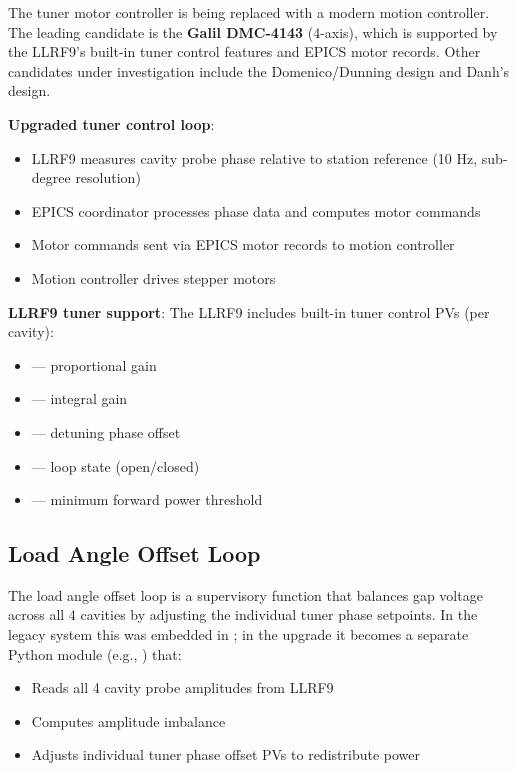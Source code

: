 The tuner motor controller is being replaced with a modern motion controller. The leading candidate is the \textbf{Galil DMC-4143} (4-axis), which is supported by the LLRF9's built-in tuner control features and EPICS motor records. Other candidates under investigation include the Domenico/Dunning design and Danh's design.

\textbf{Upgraded tuner control loop}:

\begin{itemize}
\tightlist
\item
  LLRF9 measures cavity probe phase relative to station reference (10 Hz, sub-degree resolution)
\item
  EPICS coordinator processes phase data and computes motor commands
\item
  Motor commands sent via EPICS motor records to motion controller
\item
  Motion controller drives stepper motors
\end{itemize}

\textbf{LLRF9 tuner support}: The LLRF9 includes built-in tuner control PVs (per cavity):

\begin{itemize}
\tightlist
\item
   --- proportional gain
\item
   --- integral gain
\item
   --- detuning phase offset
\item
   --- loop state (open/closed)
\item
   --- minimum forward power threshold
\end{itemize}

\subsection{Load Angle Offset Loop}\label{load-angle-offset-loop}

The load angle offset loop is a supervisory function that balances gap voltage across all 4 cavities by adjusting the individual tuner phase setpoints. In the legacy system this was embedded in ; in the upgrade it becomes a separate Python module (e.g., ) that:

\begin{itemize}
\tightlist
\item
  Reads all 4 cavity probe amplitudes from LLRF9
\item
  Computes amplitude imbalance
\item
  Adjusts individual tuner phase offset PVs to redistribute power
\end{itemize}

